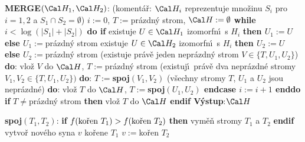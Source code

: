 \documentclass[a4paper,12pt]{article}
\begin{document}
{\bf MERGE$(\Cal H_1,\Cal H_2)$}:\newline 
(koment\'a\v r: $\Cal H_i$ reprezentuje mno\v zinu $S_i$ pro $i=1
,2$ a $S_1\cap S_2=\emptyset$)\newline 
$i:=0$, $T:=$pr\'azdn\'y strom, $\Cal H:=\emptyset$\newline 
{\bf while} $i<\log(|S_1|+|S_2|)$ {\bf do\newline 
\phantom{{\rm ---}}if} existuje $U\in \Cal H_1$ izomorfn\'\i\ s $
H_i$ {\bf then\newline 
\phantom{{\rm ------}}$U_1:=U$\newline 
\phantom{{\rm ---}}else\newline 
\phantom{{\rm ------}}$U_1:=$}pr\'azdn\'y strom\newline 
{} existuje $U\in \Cal H_2$ izomorfn\'\i\ s $
H_i$ {\bf then\newline 
\phantom{{\rm ------}}$U_2:=U$\newline 
\phantom{{\rm ---}}else\newline 
\phantom{{\rm ------}}$U_2:=$}pr\'azdn\'y strom\newline 
{}(existuje pr\'av\v e jeden nepr\'azdn\'y strom 
$V\in \{T,U_1,U_2\}$) {\bf do}:\newline 
\phantom{---------}vlo\v z $V$ do $\Cal H$, $T:=$pr\'azdn\'y strom\newline 
\phantom{------}(existuj\'\i\ pr\'av\v e dva nepr\'azdn\'e stromy 
$V_1,V_2\in \{T,U_1,U_2\})$ {\bf do}:\newline 
\phantom{---------}$T:=${\bf spoj$(V_1,V_2)$\newline 
\phantom{{\rm ------}}}(v\v sechny stromy $T$, $U_1$ a $U_2$ jsou nepr\'azdn\'e) {\bf do}:\newline 
\phantom{---------}vlo\v z $T$ do $\Cal H$, $T:=${\bf spoj$(U_1,U_
2)$\newline 
\phantom{{\rm ---}}endcase\newline 
\phantom{{\rm ---}}$i:=i+1$\newline 
enddo\newline 
if} $T\ne$pr\'azdn\'y strom {\bf then} vlo\v z $T$ do $\Cal H$ {\bf endif\newline 
V\'ystup}:$\Cal H$
\bigskip

{\bf spoj$(T_1,T_2)$}:\newline 
{\bf if} $f(\text{\rm ko\v ren }T_1)>f(\text{\rm ko\v ren }T_2)$ {\bf then\newline 
\phantom{{\rm ---}}}vym\v e\v n stromy $T_1$ a $T_2$\newline 
{\bf endif\newline 
}
vytvo\v r nov\'eho  syna $v$ ko\v rene $T_1$\newline 
$v:=$ko\v ren $T_2$
\bigskip
\end{document}
